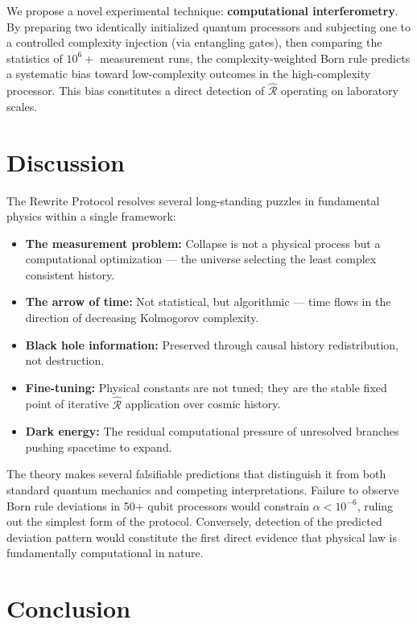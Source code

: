 \documentclass[12pt,a4paper]{article}
\begin{document}
We propose a novel experimental technique: \textbf{computational interferometry}. By preparing two identically initialized quantum processors and subjecting one to a controlled complexity injection (via entangling gates), then comparing the statistics of $10^6+$ measurement runs, the complexity-weighted Born rule predicts a systematic bias toward low-complexity outcomes in the high-complexity processor. This bias constitutes a direct detection of $\hat{\mathcal{R}}$ operating on laboratory scales.

\section{Discussion}

The Rewrite Protocol resolves several long-standing puzzles in fundamental physics within a single framework:

\begin{itemize}
    \item \textbf{The measurement problem:} Collapse is not a physical process but a computational optimization — the universe selecting the least complex consistent history.
    \item \textbf{The arrow of time:} Not statistical, but algorithmic — time flows in the direction of decreasing Kolmogorov complexity.
    \item \textbf{Black hole information:} Preserved through causal history redistribution, not destruction.
    \item \textbf{Fine-tuning:} Physical constants are not tuned; they are the stable fixed point of iterative $\hat{\mathcal{R}}$ application over cosmic history.
    \item \textbf{Dark energy:} The residual computational pressure of unresolved branches pushing spacetime to expand.
\end{itemize}

The theory makes several falsifiable predictions that distinguish it from both standard quantum mechanics and competing interpretations. Failure to observe Born rule deviations in 50+ qubit processors would constrain $\alpha < 10^{-6}$, ruling out the simplest form of the protocol. Conversely, detection of the predicted deviation pattern would constitute the first direct evidence that physical law is fundamentally computational in nature.

\section{Conclusion}
\end{document}
